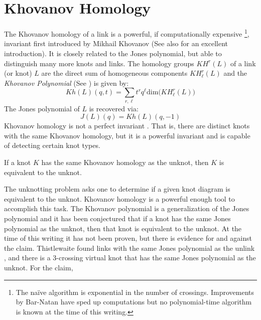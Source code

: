 \section{Khovanov Homology}
    The Khovanov homology of a link is a powerful, if computationally
    expensive%
    \footnote{%
        The na\"{i}ve algorithm is exponential in the number of
        crossings. Improvements by Bar-Natan \cite{BarNatanFastKhoHo}
        have sped up computations but no polynomial-time algorithm is
        known at the time of this writing.
    },
    invariant first introduced by Mikhail Khovanov
    \cite{Khovanov1999CatJonesPoly} (See also \cite{barnatan2002khovanov}
    for an excellent introduction). It is closely related to the Jones
    polynomial, but able to distinguish many more knots and links. The
    homology groups $KH^{r}(L)$ of a link (or knot) $L$ are the direct sum
    of homogeneous components $KH_{\ell}^{r}(L)$ and the
    \textit{Khovanov Polynomial} (See \cite{KatlasKhoHo}) is given by:
    \begin{equation}
        Kh(L)(q,t)=
        \sum_{r,\ell}t^{r}q^{\ell}\textrm{dim}\big(KH_{\ell}^{r}(L)\big)
    \end{equation}
    The Jones polynomial of $L$ is recovered via:
    \begin{equation}
        J(L)(q)=Kh(L)(q,-1)
    \end{equation}
    Khovanov homology is not a perfect invariant
    \cite{Watson2007KnotsWI}. That is, there are
    distinct knots with the same Khovanov homology, but it is a powerful
    invariant and is capable of detecting certain knot types.
    \begin{theorem}
        If a knot $K$ has the same Khovanov homology as the unknot, then $K$
        is equivalent to the unknot.
    \end{theorem}
    The unknotting problem asks one to determine if a given knot diagram is
    equivalent to the unknot. Khovanov homology is a powerful enough tool
    to accomplish this task. The Khovanov polynomial is a generalization of
    the Jones polynomial and it has been conjectured that if a
    knot has the same Jones polynomial as the unknot, then that knot is
    equivalent to the unknot. At the time of this writing it has not been
    proven, but there is evidence for and against the claim.
    Thistlewaite found links with the same Jones polynomial as the unlink
    \cite{Thistlethwaite2001LINKSWT}, and there is a 3-crossing virtual
    knot that has the same Jones polynomial as the unknot. For the claim,
